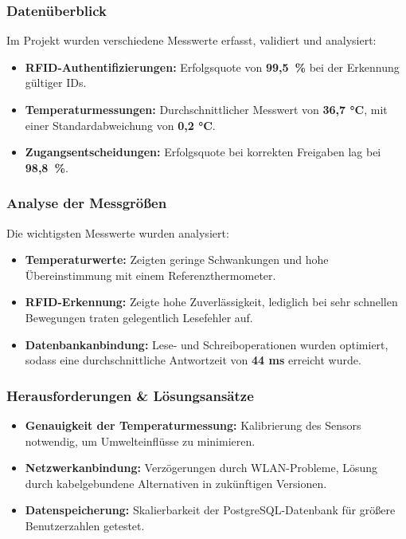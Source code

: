 \subsubsection{Datenüberblick}

Im Projekt wurden verschiedene Messwerte erfasst, validiert und analysiert:

\begin{itemize}
    \item \textbf{RFID-Authentifizierungen: }Erfolgsquote von \textbf{99,5~\%} bei der Erkennung gültiger IDs.
    \item \textbf{Temperaturmessungen: }Durchschnittlicher Messwert von \textbf{36,7 °C}, mit einer Standardabweichung von \textbf{0,2 °C}.
    \item \textbf{Zugangsentscheidungen: }Erfolgsquote bei korrekten Freigaben lag bei \textbf{98,8~\%}.
\end{itemize}

\subsubsection{Analyse der Messgrößen}

Die wichtigsten Messwerte wurden analysiert:

\begin{itemize}
    \item \textbf{Temperaturwerte: }Zeigten geringe Schwankungen und hohe Übereinstimmung mit einem Referenzthermometer.
    \item \textbf{RFID-Erkennung: }Zeigte hohe Zuverlässigkeit, lediglich bei sehr schnellen Bewegungen traten gelegentlich Lesefehler auf.
    \item \textbf{Datenbankanbindung: }Lese- und Schreiboperationen wurden optimiert, sodass eine durchschnittliche Antwortzeit von \textbf{44 ms} erreicht wurde.
\end{itemize}

\subsubsection{Herausforderungen \& Lösungsansätze}

\begin{itemize}
    \item \textbf{Genauigkeit der Temperaturmessung: }Kalibrierung des Sensors notwendig, um Umwelteinflüsse zu minimieren.
    \item \textbf{Netzwerkanbindung: }Verzögerungen durch WLAN-Probleme, Lösung durch kabelgebundene Alternativen in zukünftigen Versionen.
    \item \textbf{Datenspeicherung: }Skalierbarkeit der PostgreSQL-Datenbank für größere Benutzerzahlen getestet.
\end{itemize}

